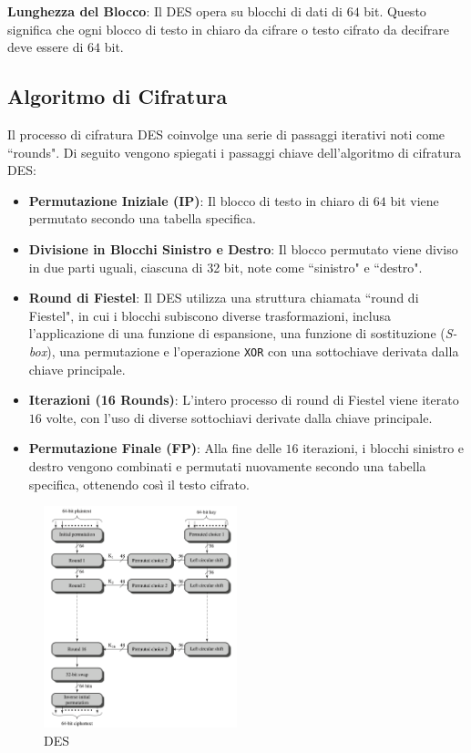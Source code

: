 \textbf{Lunghezza del Blocco}: Il DES opera su blocchi di dati di $64$ bit.
Questo significa che ogni blocco di testo in chiaro da cifrare o testo cifrato
da decifrare deve essere di $64$ bit.
\subsection{Algoritmo di Cifratura}
Il processo di cifratura DES coinvolge una serie di passaggi iterativi noti
come ``rounds". Di seguito vengono spiegati i passaggi chiave dell'algoritmo
di cifratura DES:

\begin{itemize}
    \item \textbf{Permutazione Iniziale (IP)}: Il blocco di testo in chiaro di
    $64$ bit viene permutato secondo una tabella specifica.
    \item \textbf{Divisione in Blocchi Sinistro e Destro}: Il blocco permutato
    viene diviso in due parti uguali, ciascuna di 32 bit, note come ``sinistro"
    e ``destro".
    \item \textbf{Round di Fiestel}: Il DES utilizza una struttura chiamata
    ``round di Fiestel", in cui i blocchi subiscono diverse trasformazioni,
    inclusa l'applicazione di una funzione di espansione, una funzione di
    sostituzione (\textit{S-box}), una permutazione e l'operazione \verb|XOR| con
    una sottochiave derivata dalla chiave principale.
    \item \textbf{Iterazioni (16 Rounds)}: L'intero processo di round di
    Fiestel viene iterato $16$ volte, con l'uso di diverse sottochiavi derivate
    dalla chiave principale.
    \item \textbf{Permutazione Finale (FP)}: Alla fine delle $16$ iterazioni, i
    blocchi sinistro e destro vengono combinati e permutati nuovamente secondo
    una tabella specifica, ottenendo così il testo cifrato.
\end{itemize}
\begin{figure}[H]
    \centering
    \includegraphics[width=0.5\textwidth]{img/DES-alg.png}
    \caption{DES}
\end{figure}
